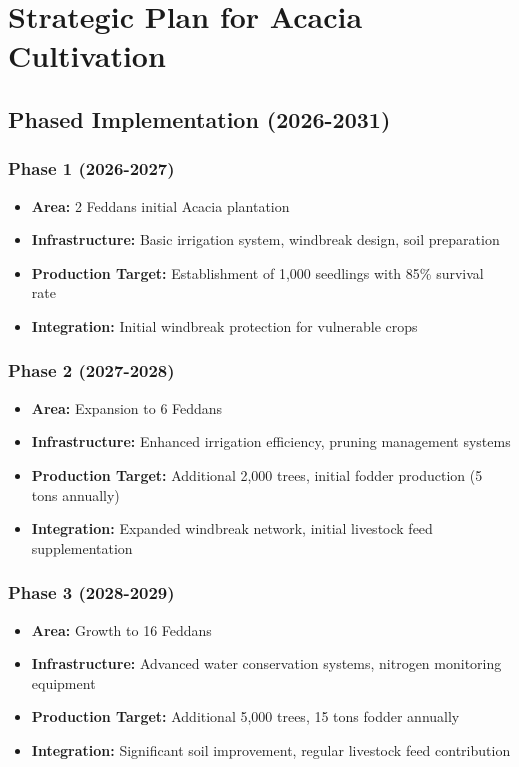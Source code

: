 \section{Strategic Plan for Acacia Cultivation}

\subsection{Phased Implementation (2026-2031)}

\subsubsection{Phase 1 (2026-2027)}
\begin{itemize}
    \item \textbf{Area:} 2 Feddans initial Acacia plantation
    \item \textbf{Infrastructure:} Basic irrigation system, windbreak design, soil preparation
    \item \textbf{Production Target:} Establishment of 1,000 seedlings with 85\% survival rate
    \item \textbf{Integration:} Initial windbreak protection for vulnerable crops
\end{itemize}

\subsubsection{Phase 2 (2027-2028)}
\begin{itemize}
    \item \textbf{Area:} Expansion to 6 Feddans
    \item \textbf{Infrastructure:} Enhanced irrigation efficiency, pruning management systems
    \item \textbf{Production Target:} Additional 2,000 trees, initial fodder production (5 tons annually)
    \item \textbf{Integration:} Expanded windbreak network, initial livestock feed supplementation
\end{itemize}

\subsubsection{Phase 3 (2028-2029)}
\begin{itemize}
    \item \textbf{Area:} Growth to 16 Feddans
    \item \textbf{Infrastructure:} Advanced water conservation systems, nitrogen monitoring equipment
    \item \textbf{Production Target:} Additional 5,000 trees, 15 tons fodder annually
    \item \textbf{Integration:} Significant soil improvement, regular livestock feed contribution
\end{itemize}

